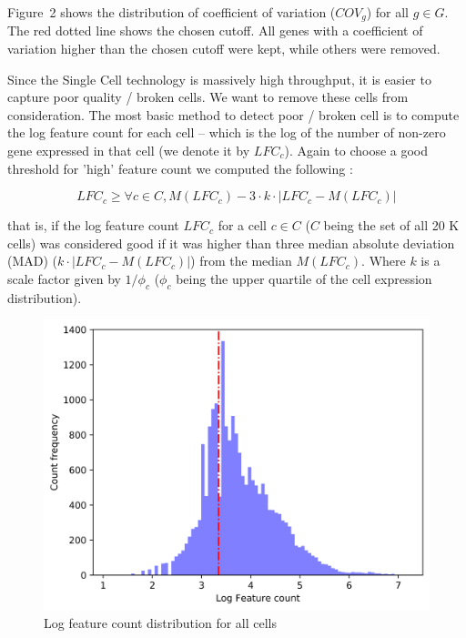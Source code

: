 Figure~2 shows the distribution of coefficient of variation ($COV_g$) for all $g \in G$. The red dotted line shows the chosen cutoff. All genes with a coefficient of variation higher than the chosen cutoff were kept, while others were removed.

Since the Single Cell technology is massively high throughput, it is easier to capture poor quality / broken cells. We want to remove these cells from consideration. The most basic method to detect poor / broken cell is to compute the log feature count for each cell -- which is the log of the number of non-zero gene expressed in that cell (we denote it by $LFC_c$). Again to choose a good threshold for 'high' feature count we computed the following :

\begin{equation}
LFC_c \geq \forall c \in C, M ( LFC_c ) - 3 \cdot k \cdot | LFC_c - M ( LFC_c ) |
\end{equation}

that is, if the log feature count $LFC_c$ for a cell $c \in C$ ($C$ being the set of all 20 K cells) was considered good if it was higher than three median absolute deviation (MAD) ($k \cdot | LFC_c - M ( LFC_c ) |$) from the median $M ( LFC_c )$. Where $k$ is a scale factor given by $1 / \phi_c$ ($\phi_c$ being the upper quartile of the cell expression distribution).

\begin{figure}
\includegraphics[width=\linewidth]{sc_20k_mouse_neurons_sample_feature_count_cutoff.png}
\caption{Log feature count distribution for all cells}
\end{figure}

